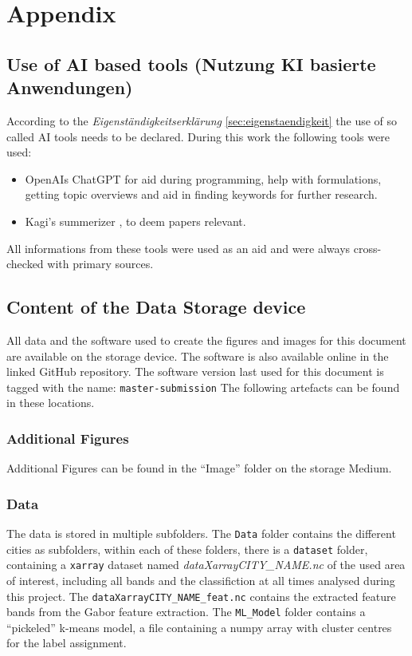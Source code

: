 \documentclass[12pt,a4paper, english,twoside]{scrartcl}
\begin{document}
\section{Appendix}
  \subsection{Use of AI based tools (Nutzung KI basierte Anwendungen)}
  According to the \textit{Eigenständigkeitserklärung} \cref{sec:eigenstaendigkeit} the use of so called AI tools needs to be declared. 
    During this work the following tools were used: 
  \begin{itemize}
    \item OpenAIs ChatGPT \autocite{chatgpt} for aid during programming, help with formulations, getting topic overviews and aid in finding keywords for further research.
    \item Kagi's summerizer \autocite{kagi}, to deem papers relevant.
    \end{itemize}
    All informations from these tools were used as an aid and were always cross-checked with primary sources. 
  \subsection{Content of the Data Storage device}
    All data and the software used to create the figures and images for this document are available on the storage device.
    The software is also available online in the linked GitHub repository.
    The software version last used for this document is tagged with the name: \texttt{master-submission}
    The following artefacts can be found in these locations.
  \subsubsection{Additional Figures}
    Additional Figures can be found in the ``Image'' folder on the storage Medium.
  \subsubsection{Data}
    The data is stored in multiple subfolders. 
    The \texttt{Data} folder contains the different cities as subfolders, within each of these folders, there is a \texttt{dataset} folder, containing a \texttt{xarray} dataset named \textit{dataXarrayCITY\_NAME.nc} of the used area of interest, including all bands and the classifiction at all times analysed during this project. 
    The \texttt{dataXarrayCITY\_NAME\_feat.nc} contains the extracted feature bands from the Gabor feature extraction.
    The \texttt{ML\_Model} folder contains a ``pickeled'' k-means model, a file containing a numpy array with cluster centres for the label assignment. 
\end{document}
